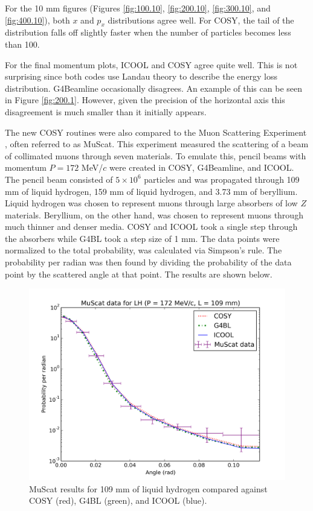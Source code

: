 For the 10 mm figures (Figures \ref{fig:100.10}, \ref{fig:200.10}, \ref{fig:300.10}, and \ref{fig:400.10}), both $x$ and $p_x$ distributions agree well. For COSY, the tail of the distribution falls off slightly faster when the number of particles becomes less than 100. 

For the final momentum plots, ICOOL and COSY agree quite well. This is not surprising since both codes use Landau theory to describe the energy loss distribution. G4Beamline occasionally disagrees. An example of this can be seen in Figure \ref{fig:200.1}. However, given the precision of the horizontal axis this disagreement is much smaller than it initially appears.

\label{sec:validation}

The new COSY routines were also compared to the Muon Scattering Experiment \cite{muscat}, often referred to as MuScat. This experiment measured the scattering of a beam of collimated muons through seven materials. To emulate this, pencil beams with momentum $P=172$ MeV/$c$ were created in COSY, G4Beamline, and ICOOL. The pencil beam consisted of $5\times10^6$ particles and was propagated through 109 mm of liquid hydrogen, 159 mm of liquid hydrogen, and 3.73 mm of beryllium. Liquid hydrogen was chosen to represent muons through large absorbers of low $Z$ materials. Beryllium, on the other hand, was chosen to represent muons through much thinner and denser media. COSY and ICOOL took a single step through the absorbers while G4BL took a step size of 1 mm. The data points were normalized to the total probability, was calculated via Simpson's rule. The probability per radian was then found by dividing the probability of the data point by the scattered angle at that point. The results are shown below.

\begin{figure}[H]
  \centering
    \includegraphics[width=\textwidth]{Figures/172.109.muscat} 
  \caption{MuScat results for 109 mm of liquid hydrogen compared against COSY (red), G4BL (green), and ICOOL (blue).}
  \label{fig:172.109.muscat}
\end{figure}

